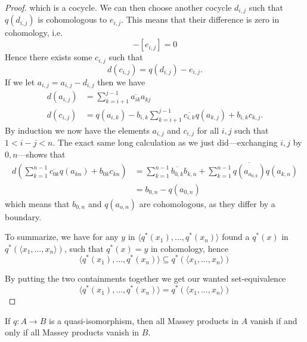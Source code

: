 \begin{proof}
which is a cocycle. We can then choose another cocycle $d_{i,j}$ such that $q(d_{i,j})$ is cohomologous to $e_{i,j}$. This means that their difference is zero in cohomology, i.e. 
\begin{equation*}
    [q(d_{i,j})]-[e_{i,j}] = 0
\end{equation*}
Hence there exists some $c_{i,j}$ such that 
\begin{equation*}
    d(c_{i,j}) = q(d_{i,j}) - e_{i,j}.
\end{equation*}
If we let $a_{i,j} = a_{i,j}-d_{i,j}$ then we have 
\begin{align*}
    d(a_{i,j}) &= \sum_{k=i+1}^{j-1}\overline{a_{ik}}a_{kj} 
    \\
    d(c_{i,j}) &= q(a_{i,k}) - b_{i,k} \sum_{k=i+1}^{j-1}\overline{c_{i,k}}q(a_{k,j}) + b_{i,k}c_{k,j}.
\end{align*}
By induction we now have the elements $a_{i,j}$ and $c_{i,j}$ for all $i,j$ such that $1<i-j<n$. The exact same long calculation as we just did---exchanging $i,j$ by $0,n$---shows that 
\begin{align*}
    d\left(\sum_{k=1}^{n-1}\overline{c_{0k}}q(a_{kn})+b_{0k}c_{kn}\right)
    &=
    \sum_{k=1}^{n-1}\overline{b_{0,k}}b_{k,n} + \sum_{k=1}^{n-1}\overline{q(a_{a_{0,k}})}q(a_{k,n}) \\
    &= b_{0,n} - q(a_{0,n})
\end{align*}
which means that $b_{0,n}$ and $q(a_{o,n})$ are cohomologous, as they differ by a boundary. 

To summarize, we have for any $y$ in $ \langle q^*(x_1), \ldots, q^*(x_n)\rangle$ found a $q^*(x)$ in $q^*(\langle x_1, \ldots, x_n\rangle)$, such that $q^*(x)=y$ in cohomology, hence
\begin{equation*}
    \langle q^*(x_1), \ldots, q^*(x_n)\rangle \subseteq q^*(\langle x_1, \ldots, x_n\rangle)
\end{equation*}

By putting the two containments together we get our wanted set-equivalence 
\begin{equation*}
    \langle q^*(x_1), \ldots, q^*(x_n)\rangle = q^*(\langle x_1, \ldots, x_n\rangle)
\end{equation*}
\end{proof}


\begin{corollary}
\label{cor:quasi_preserves_vanishing}
If $q\colon A\longrightarrow B$ is a quasi-isomorphism, then all Massey products in $A$ vanish if and only if all Massey products vanish in $B$. 
\end{corollary}

